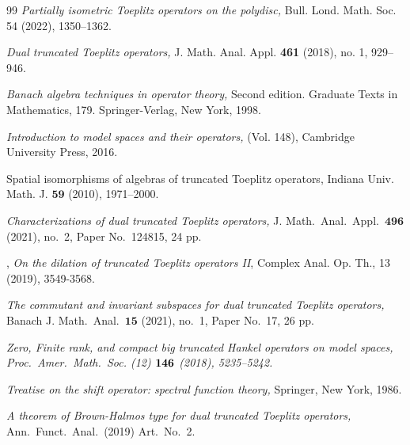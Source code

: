 \documentclass[12pt]{amsart}
\theoremstyle{definition}
\theoremstyle{plain}
\theoremstyle{definition}
\numberwithin{equation}{section}
\begin{document}
\begin{thebibliography}{99}
		{\it Partially isometric Toeplitz operators on the polydisc,}
		{Bull. Lond. Math. Soc. 54 (2022), 1350--1362}.
		
		{\it Dual truncated Toeplitz operators,}
		{J. Math. Anal. Appl. {\bf{461}} (2018), no. 1, 929--946.}
		
		{\it Banach algebra techniques in operator theory,} 
		{Second edition. Graduate Texts in Mathematics, 179. Springer-Verlag, New York, 1998}.
		
		{\it Introduction to model spaces and their operators,}
		{(Vol. 148), Cambridge University Press, 2016.}
		
		
		{Spatial isomorphisms of algebras of truncated Toeplitz operators,}
		{Indiana Univ. Math. J. $\bm{59}$ (2010), 1971--2000.}
		
		{\it Characterizations of dual truncated Toeplitz operators,}
		{J. Math.\ Anal.\ Appl.\ $\bm{496}$ (2021),  no.\ 2, Paper No.\ 124815, 24 pp.}
		
		, 
		{\it On the dilation of truncated Toeplitz operators II}, 
		{Complex Anal. Op. Th., 13 (2019), 3549-3568.}
	
		{\it The commutant and invariant subspaces for dual truncated Toeplitz operators,}
		{Banach J. Math.\ Anal.\ $\bm{15}$ (2021), no.\ 1, Paper No.\ 17, 26 pp.}
		
		{\it Zero, Finite rank, and compact big truncated Hankel operators on model spaces, Proc.\ Amer.\ Math.\ Soc. (12) $\bf{146}$ (2018), 5235--5242.}	
		
		{\it Treatise on the shift operator: spectral function theory,}
		{Springer, New York, 1986.}
		
		
		{\it A theorem of Brown-Halmos type for dual truncated Toeplitz operators,}
		{Ann.\ Funct.\ Anal.\ (2019) Art.\ No.\ 2.}
		

\end{thebibliography}
\end{document}
